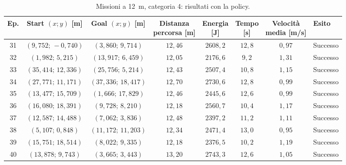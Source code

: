 \begin{table}[H]
\centering
\caption{Missioni a 12~m, categoria 4: risultati con la policy.}
\label{tab:big-map-12m-cat4}
\begingroup
\fontsize{9}{11}\selectfont
\setlength{\tabcolsep}{2.5pt}
\renewcommand{\arraystretch}{1.2}
\begin{tabular}{@{}c cc cccc l@{}}
\toprule
Ep. & \shortstack{Start $(x;y)$\\{}[m]} & \shortstack{Goal $(x;y)$\\{}[m]} & \shortstack{Distanza\\percorsa [m]} & \shortstack{Energia\\{}[J]} & \shortstack{Tempo\\{}[s]} & \shortstack{Velocità\\media [m/s]} & Esito \\
\midrule
31 & $(9{,}752;\,-0{,}740)$ & $(3{,}860;\,9{,}714)$ & $12{,}46$ & $2608{,}2$ & $12{,}8$ & $0{,}97$ & Successo \\
32 & $(1{,}982;\,5{,}215)$ & $(13{,}917;\,6{,}459)$ & $12{,}05$ & $2176{,}6$ & $9{,}2$ & $1{,}31$ & Successo \\
33 & $(35{,}414;\,12{,}336)$ & $(25{,}756;\,5{,}214)$ & $12{,}43$ & $2507{,}4$ & $10{,}8$ & $1{,}15$ & Successo \\
34 & $(27{,}771;\,11{,}171)$ & $(37{,}336;\,18{,}417)$ & $12{,}70$ & $2730{,}6$ & $12{,}8$ & $0{,}99$ & Successo \\
35 & $(13{,}477;\,15{,}709)$ & $(1{,}666;\,17{,}829)$ & $12{,}46$ & $2445{,}6$ & $12{,}6$ & $0{,}99$ & Successo \\
36 & $(16{,}080;\,18{,}391)$ & $(9{,}728;\,8{,}210)$ & $12{,}18$ & $2560{,}7$ & $10{,}4$ & $1{,}17$ & Successo \\
37 & $(12{,}587;\,14{,}488)$ & $(7{,}062;\,3{,}836)$ & $12{,}48$ & $2397{,}2$ & $11{,}2$ & $1{,}11$ & Successo \\
38 & $(5{,}107;\,0{,}848)$ & $(11{,}172;\,11{,}203)$ & $12{,}34$ & $2471{,}4$ & $13{,}0$ & $0{,}95$ & Successo \\
39 & $(15{,}751;\,18{,}514)$ & $(8{,}022;\,9{,}335)$ & $12{,}18$ & $2376{,}5$ & $10{,}2$ & $1{,}19$ & Successo \\
40 & $(13{,}878;\,9{,}743)$ & $(3{,}665;\,3{,}443)$ & $13{,}20$ & $2743{,}3$ & $12{,}6$ & $1{,}05$ & Successo \\
\bottomrule
\end{tabular}
\endgroup
\end{table}
